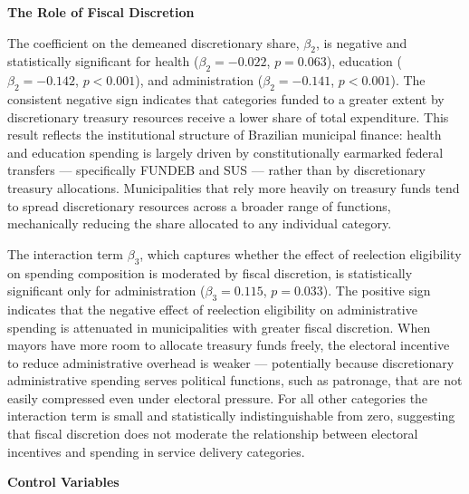 \documentclass[12pt, a4paper]{article}
\begin{document}
\textbf{\large{The Role of Fiscal Discretion}}

The coefficient on the demeaned discretionary share, $\beta_2$, is negative and statistically significant for health ($\beta_2 = -0.022$, $p = 0.063$), education ($\beta_2 = -0.142$, $p < 0.001$), and administration ($\beta_2 = -0.141$, $p < 0.001$). The consistent negative sign indicates that categories funded to a greater extent by discretionary treasury resources receive a lower share of total expenditure. This result reflects the institutional structure of Brazilian municipal finance: health and education spending is largely driven by constitutionally earmarked federal transfers --- specifically FUNDEB and SUS --- rather than by discretionary treasury allocations. Municipalities that rely more heavily on treasury funds tend to spread discretionary resources across a broader range of functions, mechanically reducing the share allocated to any individual category.

The interaction term $\beta_3$, which captures whether the effect of reelection eligibility on spending composition is moderated by fiscal discretion, is statistically significant only for administration ($\beta_3 = 0.115$, $p = 0.033$). The positive sign indicates that the negative effect of reelection eligibility on administrative spending is attenuated in municipalities with greater fiscal discretion. When mayors have more room to allocate treasury funds freely, the electoral incentive to reduce administrative overhead is weaker --- potentially because discretionary administrative spending serves political functions, such as patronage, that are not easily compressed even under electoral pressure. For all other categories the interaction term is small and statistically indistinguishable from zero, suggesting that fiscal discretion does not moderate the relationship between electoral incentives and spending in service delivery categories.

\textbf{{\large Control Variables}}
\end{document}

